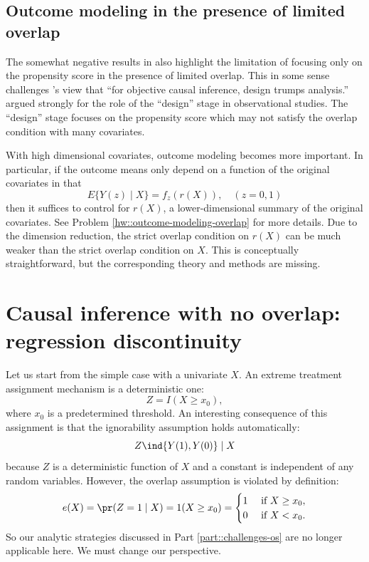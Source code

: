 \subsection{Outcome modeling in the presence of limited overlap}\label{sec::outcome-modeling-overlap}


The somewhat negative results in  \citet{d2017overlap} also highlight the limitation of focusing only on the propensity score in the presence of limited overlap. This in some sense challenges \citet{rubin2008objective}'s view that ``for objective causal inference, design trumps analysis.'' \citet{rubin2008objective} argued strongly for the role of the ``design'' stage in observational studies. The ``design'' stage focuses on the propensity score which may not satisfy the overlap condition with many covariates. 



With high dimensional covariates, outcome modeling becomes more important. In particular, if the outcome means only depend on a function of the original covariates in that
$$
E\{  Y(z) \mid X \} = f_z( r(X)   ),\quad (z=0,1)
$$
then it suffices to control for $r(X)$, a lower-dimensional summary of the original covariates. See Problem \ref{hw::outcome-modeling-overlap} for more details. Due to the dimension reduction, the strict overlap condition on $r(X)$ can be much weaker than the strict overlap condition on $X$. This is conceptually straightforward, but the corresponding theory and methods are missing. 



\section{Causal inference with no overlap: regression discontinuity}
\label{sec::rdd}

Let us start from the simple case with a univariate $X$. 
An extreme treatment assignment mechanism is a deterministic one:
 $$
 Z = I(X \geq x_0),
$$
where $x_0$ is a predetermined threshold. 
An interesting consequence of this assignment is that the ignorability  assumption holds automatically:
$$
Z\ind \{  Y(1), Y(0) \} \mid X
$$
because $Z$ is a deterministic function of $X$ and a constant is independent of any random variables. However, the overlap assumption is violated by definition:
$$
e(X) = \pr(Z=1\mid X) = 1(X \geq x_0)
=\begin{cases}
1 & \text{ if } X \geq x_0, \\
0& \text{ if }  X < x_0.
\end{cases}
$$
So our analytic strategies discussed in Part \ref{part::challenges-os} are no longer applicable here. We must change our perspective.  


